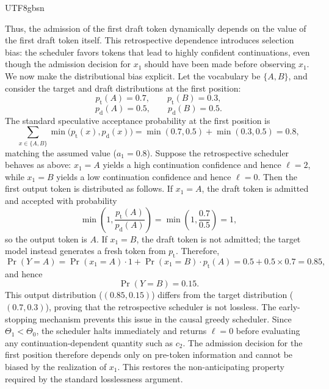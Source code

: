 \documentclass[11pt, a4paper, logo, copyright, nonumbering]{deepseek}
\begin{document}
\begin{CJK*}{UTF8}{gbsn}
\begin{itemize}
\end{itemize}
Thus, the admission of the first draft token dynamically depends on the value of the first draft token itself. This retrospective dependence introduces selection bias: the scheduler favors tokens that lead to highly confident continuations, even though the admission decision for $x_1$ should have been made before observing $x_1$.
We now make the distributional bias explicit. Let the vocabulary be $\{A,B\}$, and consider the target and draft distributions at the first position:
\[
p_{\mathrm{t}}(A)=0.7,\qquad p_{\mathrm{t}}(B)=0.3,
\]
\[
p_{\mathrm{d}}(A)=0.5,\qquad p_{\mathrm{d}}(B)=0.5.
\]
The standard speculative acceptance probability at the first position is
\[
\sum_{x\in\{A,B\}} \min\bigl(p_{\mathrm{t}}(x),p_{\mathrm{d}}(x)\bigr)
=
\min(0.7,0.5)+\min(0.3,0.5)
=
0.8,
\]
matching the assumed value ($a_1=0.8$).
Suppose the retrospective scheduler behaves as above: $x_1=A$ yields a high continuation confidence and hence $\ell=2$, while $x_1=B$ yields a low continuation confidence and hence $\ell=0$. Then the first output token is distributed as follows. If $x_1=A$, the draft token is admitted and accepted with probability
\[
\min\left(1,\frac{p_{\mathrm{t}}(A)}{p_{\mathrm{d}}(A)}\right)
=
\min\left(1,\frac{0.7}{0.5}\right)
=
1,
\]
so the output token is $A$. If $x_1=B$, the draft token is not admitted; the target model instead generates a fresh token from $p_{\mathrm{t}}$. Therefore,
\[
\Pr(Y=A)
=
\Pr(x_1=A)\cdot 1
+
\Pr(x_1=B)\cdot p_{\mathrm{t}}(A)
=
0.5 + 0.5 \times 0.7
=
0.85,
\]
and hence
\[
\Pr(Y=B)=0.15.
\]
This output distribution ($(0.85,0.15)$) differs from the target distribution ($(0.7,0.3)$), proving that the retrospective scheduler is not lossless.
The early-stopping mechanism prevents this issue in the causal greedy scheduler. Since $\Theta_1 < \Theta_0$, the scheduler halts immediately and returns $\ell=0$ before evaluating any continuation-dependent quantity such as $c_2$. The admission decision for the first position therefore depends only on pre-token information and cannot be biased by the realization of $x_1$. This restores the non-anticipating property required by the standard losslessness argument.

\end{CJK*}
\end{document}
